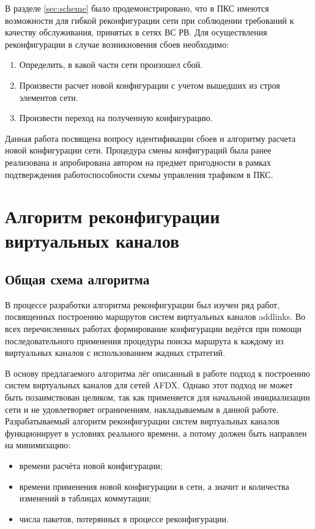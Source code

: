 \documentclass[12pt, a4paper]{article}
\begin{document}
В разделе \ref{sec:scheme} было продемонстрировано, что в ПКС имеются возможности для гибкой реконфигурации сети при соблюдении требований к качеству обслуживания, принятых в сетях ВС РВ. Для осуществления реконфигурации в случае возникновения сбоев необходимо:
\begin{enumerate}
	\item Определить, в какой части сети произошел сбой.
	\item Произвести расчет новой конфигурации с учетом вышедших из строя элементов сети.
	\item Произвести переход на полученную конфигурацию.
\end{enumerate}

Данная работа посвящена вопросу идентификации сбоев и алгоритму расчета новой конфигурации сети. Процедура смены конфигураций была ранее реализована и апробирована автором на предмет пригодности в рамках подтверждения работоспособности схемы управления трафиком в ПКС.

\section{Алгоритм реконфигурации виртуальных каналов} \label{sec:alg}
\subsection{Общая схема алгоритма}

В процессе разработки алгоритма реконфигурации был изучен ряд работ, посвященных построению маршрутов систем виртуальных каналов addlinks. Во всех перечисленных работах формирование конфигурации ведётся при помощи последовательного применения процедуры поиска маршрута к каждому из виртуальных каналов с использованием жадных стратегий.

В основу предлагаемого алгоритма лёг описанный в работе \cite{vdovinalg} подход к построению систем виртуальных каналов для сетей AFDX. Однако этот подход не может быть позаимствован целиком, так как применяется для начальной инициализации сети и не удовлетворяет ограничениям, накладываемым в данной работе. Разрабатываемый алгоритм реконфигурации систем виртуальных каналов функционирует в условиях реального времени, а потому должен быть направлен на минимизацию:
\begin{itemize}
	\item времени расчёта новой конфигурации;
	\item времени применения новой конфигурации в сети, а значит и количества изменений в таблицах коммутации;
	\item числа пакетов, потерянных в процессе реконфигурации.
\end{itemize} 
\end{document}
